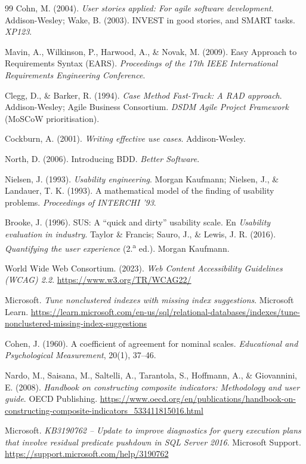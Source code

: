 \documentclass[11pt,a4paper]{report}
\begin{document}
\begin{thebibliography}{99}
 Cohn, M. (2004). \textit{User stories applied: For agile software development}. Addison-Wesley; Wake, B. (2003). INVEST in good stories, and SMART tasks. \textit{XP123}.

 Mavin, A., Wilkinson, P., Harwood, A., \& Novak, M. (2009). Easy Approach to Requirements Syntax (EARS). \textit{Proceedings of the 17th IEEE International Requirements Engineering Conference}.

 Clegg, D., \& Barker, R. (1994). \textit{Case Method Fast-Track: A RAD approach}. Addison-Wesley; Agile Business Consortium. \textit{DSDM Agile Project Framework} (MoSCoW prioritisation).

 Cockburn, A. (2001). \textit{Writing effective use cases}. Addison-Wesley.

 North, D. (2006). Introducing BDD. \textit{Better Software}.

 Nielsen, J. (1993). \textit{Usability engineering}. Morgan Kaufmann; Nielsen, J., \& Landauer, T. K. (1993). A mathematical model of the finding of usability problems. \textit{Proceedings of INTERCHI '93}.

 Brooke, J. (1996). SUS: A \textquotedblleft quick and dirty\textquotedblright{} usability scale. En \textit{Usability evaluation in industry}. Taylor \& Francis; Sauro, J., \& Lewis, J. R. (2016). \textit{Quantifying the user experience} (2.\textsuperscript{a} ed.). Morgan Kaufmann.

 World Wide Web Consortium. (2023). \textit{Web Content Accessibility Guidelines (WCAG) 2.2}. \url{https://www.w3.org/TR/WCAG22/}

 Microsoft. \textit{Tune nonclustered indexes with missing index suggestions}. Microsoft Learn. \url{https://learn.microsoft.com/en-us/sql/relational-databases/indexes/tune-nonclustered-missing-index-suggestions}

 Cohen, J. (1960). A coefficient of agreement for nominal scales. \textit{Educational and Psychological Measurement}, 20(1), 37--46.

 Nardo, M., Saisana, M., Saltelli, A., Tarantola, S., Hoffmann, A., \& Giovannini, E. (2008). \textit{Handbook on constructing composite indicators: Methodology and user guide}. OECD Publishing. \url{https://www.oecd.org/en/publications/handbook-on-constructing-composite-indicators_533411815016.html}

 Microsoft. \textit{KB3190762 -- Update to improve diagnostics for query execution plans that involve residual predicate pushdown in SQL Server 2016}. Microsoft Support. \url{https://support.microsoft.com/help/3190762}


\end{thebibliography}
\end{document}
